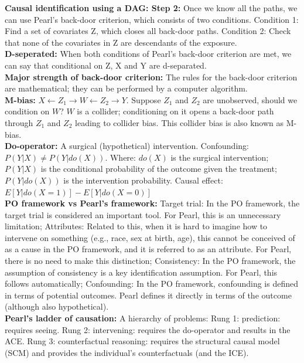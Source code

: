\documentclass[a4paper,7pt,landscape]{extarticle}
\begin{document}
\begin{multicols}{3}
\begin{boxA}
\textbf{Causal identification using a DAG: Step 2:} Once we know all the paths, we can use Pearl’s back-door criterion, which consists of two conditions. Condition 1: Find a set of covariates Z, which closes all back-door paths. Condition 2: Check that none of the covariates in Z are descendants of the exposure.\\
\textbf{D-seperated:} When both conditions of Pearl's back-door criterion are met, we can say that conditional on Z, X and Y are d-separated.\\
\textbf{Major strength of back-door criterion:} The rules for the back-door criterion are mathematical; they can be performed by a computer algorithm.\\
\textbf{M-bias:} $X \leftarrow Z_1 \rightarrow W \leftarrow Z_2 \rightarrow Y$. Suppose $Z_1$ and $Z_2$ are unobserved, should we condition on $W$? $W$ is a collider; conditioning on it opens a back-door path through $Z_1$ and $Z_2$ leading to collider bias. This collider bias is also known as M-bias.\\
\textbf{Do-operator:} A surgical (hypothetical) intervention. Confounding: $P(Y|X) \neq P(Y|do(X))$. Where: $do(X)$ is the surgical intervention; $P(Y|X)$ is the conditional probability of the outcome given the treatment; $P(Y|do(X))$ is the intervention probability. Causal effect: $E[Y|do(X = 1)]-E[Y|do(X = 0)]$\\
\textbf{PO framework vs Pearl's framework:} Target trial: In the PO framework, the target trial is considered an important tool. For Pearl, this is an unnecessary limitation; Attributes: Related to this, when it is hard to imagine how to intervene on something (e.g., race, sex at birth, age), this cannot be conceived of as a cause in the PO framework, and it is referred to as an attribute. For Pearl, there is no need to make this distinction; Consistency: In the PO framework, the assumption of consistency is a key identification assumption. For Pearl, this follows automatically; Confounding: In the PO framework, confounding is defined in terms of potential outcomes. Pearl defines it directly in terms of the outcome (although also hypothetical).\\
\textbf{Pearl’s ladder of causation:} A hierarchy of problems: Rung 1: prediction: requires seeing. Rung 2: intervening: requires the do-operator and results in the ACE. Rung 3: counterfactual reasoning: requires the structural causal model (SCM) and provides the individual’s counterfactuals (and the ICE).\\

\end{boxA}
\end{multicols}
\end{document}
